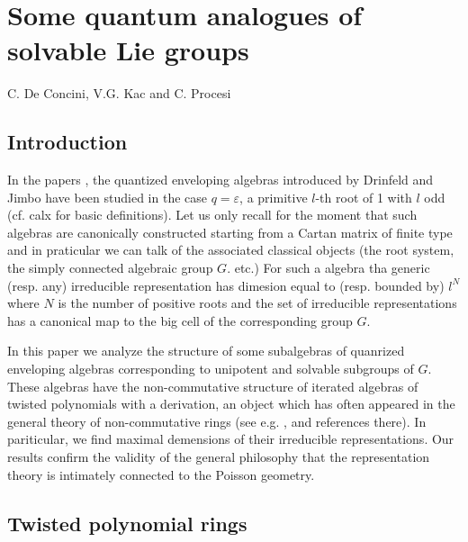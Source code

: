 \chapter{Some quantum analogues of solvable Lie groups}\label{chap4}


\begin{center}
C. De Concini, V.G. Kac and C. Procesi
\end{center}


\section*{Introduction}
\pageoriginale
In the papers \cite{chap4-keyDK1} \cite{chap4-keyDK2}, \cite{chap4-keyDKP1} \cite{chap4-keyDKP2}the quantized enveloping algebras introduced by Drinfeld and Jimbo have been studied in the case $q=\varepsilon$, a primitive $l$-th root of 1 with $l$ odd (cf. calx for basic definitions). Let us only recall for the moment that such algebras are canonically constructed starting from a Cartan matrix of finite type and in praticular we can talk of the associated classical objects (the root system, the simply connected algebraic group $G$. etc.) For such a algebra tha generic (resp. any) irreducible representation has dimesion equal to (resp. bounded by) $l^{N}$ where $N$ is the number of positive roots and the set of irreducible representations has a canonical map to the big cell of the corresponding group $G$.

In this paper we analyze the structure of some subalgebras of quanrized enveloping algebras corresponding to unipotent and solvable subgroups of $G$. These algebras have the non-commutative structure of iterated algebras of twisted polynomials with a derivation, an object which has often appeared in the general theory of non-commutative rings (see e.g. \cite{chap4-keyKP}, \cite{chap4-keyGL} and references there). In  pariticular, we find maximal demensions of their irreducible representations. Our results confirm the validity of the general philosophy that the representation theory is intimately connected to the Poisson geometry.

\section{Twisted polynomial rings}\label{chap4-sec1}

